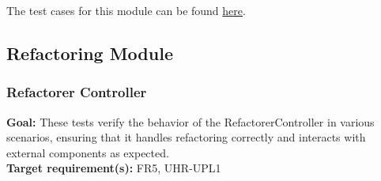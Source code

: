 \documentclass[12pt, titlepage]{article}
\begin{document}
\noindent The test cases for this module can be found \href{https://github.com/ssm-lab/capstone--source-code-optimizer/blob/main/src/ecooptimizer/measurements/codecarbon_energy_meter.py}{here}.

  \subsection{Refactoring Module}

  \subsubsection{Refactorer Controller}

  \textbf{Goal:} These tests verify the behavior of the
  RefactorerController in various scenarios, ensuring that it handles
  refactoring correctly and interacts with external components as expected.\\

  \noindent \textbf{Target requirement(s):} FR5, UHR-UPL1~\cite{SRS} \\
\end{document}
